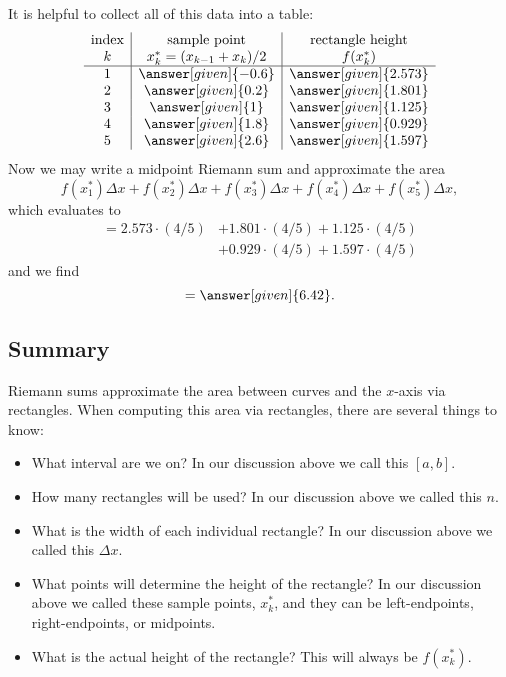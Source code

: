 \documentclass{ximera}
\begin{document}
\begin{example}
\begin{explanation}
It is helpful to collect all of this data into a table:
\[
\begin{array}{c|c|c}
\text{index}&\text{sample point}&\text{rectangle height}\\
  k &   x^*_k=(x_{k-1}+x_k)/2 & f(x^*_k) \\ \hline
  1 &  \answer[given]{-0.6}    & \answer[given]{2.573}   \\
  2 &  \answer[given]{0.2}     & \answer[given]{1.801}   \\
  3 &  \answer[given]{1}       & \answer[given]{1.125}   \\
  4 & \answer[given]{1.8}     & \answer[given]{0.929}   \\
  5 & \answer[given]{2.6}     & \answer[given]{1.597}   \\
\end{array}
\]
Now we may write a midpoint Riemann sum and approximate the area
\[
f(x_1^*)\Delta x + f(x_2^*)\Delta x + f(x_3^*)\Delta x+ f(x_4^*)\Delta x + f(x_5^*)\Delta x,
\]
which evaluates to
\begin{align*}
  = 2.573 \cdot (4/5) &+ 1.801\cdot(4/5) + 1.125 \cdot(4/5) \\
  &+ 0.929 \cdot(4/5) + 1.597\cdot(4/5)
\end{align*}
and we find
\[
= \answer[given]{6.42}.
\]
  \end{explanation}
\end{example}



\subsection{Summary}

Riemann sums approximate the area between curves and the $x$-axis via
rectangles.  When computing this area via rectangles, there are
several things to know:
\begin{itemize}
\item What interval are we on? In our discussion above we call this
    $[a,b]$.
  \item How many rectangles will be used? In our discussion above we
    called this $n$.
  \item What is the width of each individual rectangle? In our discussion above we
    called this $\Delta x$.
  \item What points will determine the height of the rectangle? In our
    discussion above we called these sample points, $x_k^*$, and they
    can be left-endpoints, right-endpoints, or midpoints.
  \item What is the actual height of the rectangle? This will always
    be $f(x_k^*)$.
\end{itemize}
\end{document}
